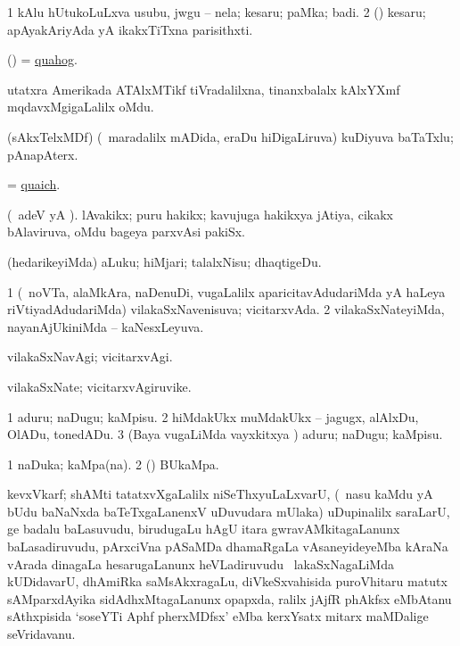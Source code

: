 \bentry
{}
\gl{\nA}
\bmng
\bnum
\num{1} kAlu hUtukoLuLxva usubu, jwgu -- nela; kesaru; paMka; badi. 
\num{2} (\rUpa) kesaru; apAyakAriyAda yA ikakxTiTxna parisithxti. 
\enum
\emng
\eentry

\bentry
{}
\gl{\nA}
\bmng
(\ame) = \hyperlink{quahog}{quahog}. 
\emng
\eentry

\bentry
{}
\gl{\nA}
\bmng
utatxra Amerikada ATAlxMTikf tiVradalilxna, tinanxbalalx kAlx$\!$YXmf mqdavxMgigaLalilx oMdu. 
\emng
\eentry

\bentry
{}
\gl{\nA}
\bmng
(sAkxTelxMDf) (\sA\ maradalilx mADida, eraDu hiDigaLiruva) kuDiyuva baTaTxlu; pAnapAterx. 
\emng
\eentry

\bentry
{}
\gl{\nA}
\bmng
= \hyperlink{quaich}{quaich}. 
\emng
\eentry

\bentry
{}
\gl{\nA}
\bmng
(\bava\ adeV yA ). lAvakikx; puru hakikx; kavujuga hakikxya jAtiya, cikakx bAlaviruva, oMdu bageya parxvAsi pakiSx. 
\emng
\eentry

\bentry
{}
\gl{\akirx}
\bmng
(hedarikeyiMda) aLuku; hiMjari; talalxNisu; dhaqtigeDu. 
\emng
\eentry

\bentry
{}
\gl{\gu}
\bmng
\bnum
\num{1} (\kanmu\ noVTa, alaMkAra, naDenuDi, \mo vugaLalilx aparicitavAdudariMda yA haLeya riVtiyadAdudariMda) vilakaSxNavenisuva; vicitarxvAda. 
\num{2} vilakaSxNa\-teyiMda, nayanAjUkiniMda -- kaNesxLeyuva. 
\enum
\emng
\eentry

\bentry
{}
\gl{\kirxvi}
\bmng
vilakaSxNavAgi; vicitarxvAgi. 
\emng
\eentry

\bentry
{}
\gl{\nA}
\bmng
vilakaSxNate; vicitarxvAgiruvike. 
\emng
\eentry

\bentry
{}
\gl{\akirx}
\bmng
\bnum
\num{1} aduru; naDugu; kaMpisu. 
\num{2} hiMdakUkx muMdakUkx -- jagugx, alAlxDu, OlADu, tonedADu. 
\num{3} (Baya \mo vugaLiMda vayxkitxya \vi) aduru; naDugu; kaMpisu. 
\enum
\emng
\eentry

\bentry
{}
\gl{\nA}
\bmng
\bnum
\num{1} naDuka; kaMpa(na). 
\num{2} (\AmA) BUkaMpa. 
\enum
\emng
\eentry

\bentry
{}
\gl{\nA}
\bmng
kevxVkarf; shAMti tatatxvXgaLalilx niSeThxyuLaLxvarU, (\kanmu\ nasu kaMdu yA bUdu baNaNxda baTeTxgaLanenxV uDuvudara mUlaka) uDupinalilx saraLarU, ge badalu  baLa\-suvudu, birudugaLu hAgU itara gwravAMkitagaLanunx baLasadiruvudu, pArxciVna pASaMDa dhamaRgaLa vAsaneyideyeMba kAraNa vArada dinagaLa hesarugaLanunx heVLadiruvudu \mo\ lakaSxNagaLiMda kUDidavarU, dhAmiRka saMsAkxragaLu, diVkeSxvahisida puroVhitaru matutx sAMparxdAyika sidAdhxMtagaLanunx opapxda, ralilx jAjfR phAkfsx eMbAtanu sAthxpisida `soseYTi Aphf pherxMDfsx' eMba kerxYsatx mitarx maMDalige seVridavanu. 
\emng
\eentry

